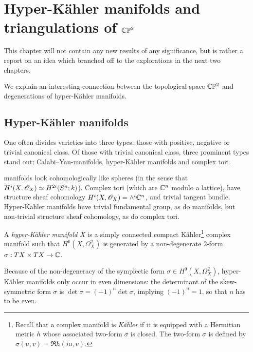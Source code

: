 \chapter{Hyper-Kähler manifolds and triangulations of \texorpdfstring{$\mathbb{C}\mathbb{P}^2$}{CP2}}
\label{sec:cp2triangs}

This chapter will not contain any new results of any significance, but is rather a report on an idea which branched off to the explorations in the next two chapters.

We explain an interesting connection between the topological space $\mathbb{C} \mathbb{P}^2$ and degenerations of hyper-Kähler manifolds.

\section{Hyper-Kähler manifolds} %
\label{sec:hyper_kähler_manifolds}

One often divides varieties into three types: those with positive, negative or trivial canonical class. Of those with trivial canonical class, three prominent types stand out: Calabi--Yau-manifolds, hyper-Kähler manifolds and complex tori.

\CY manifolds look cohomologically like spheres (in the sense that $H^i(X,\mathscr{O}_X) \simeq H^{2i}(S^n; k)$). Complex tori (which are $\mathbb{C}^n$ modulo a lattice), have structure sheaf cohomology $H^i(X,\mathscr{O}_X) = \wedge^i \mathbb{C}^n$, and trivial tangent bundle. Hyper-Kähler manifolds have trivial fundamental group, as do \CY manifolds, but non-trivial structure sheaf cohomology, as do complex tori.

\begin{definition}
A \emph{hyper-Kähler manifold} $X$ is a simply connected compact Kähler\footnote{Recall that a complex manifold is \emph{Kähler} if it is equipped with a Hermitian metric $h$ whose associated two-form $\sigma$ is closed. The two-form $\sigma$ is defined by $\sigma(u,v) = \Re h(iu,v)$.} complex manifold such that $H^0(X, \Omega_X^2)$ is generated by a non-degenerate $2$-form $\sigma: TX \times TX \to \mathbb{C}$.
\end{definition}

\begin{remark}
Because of the non-degeneracy of the symplectic form $\sigma \in H^0(X, \Omega_X^2)$, hyper-Kähler manifolds only occur in even dimensions: the determinant of the skew-symmetric form $\sigma$ is $\det \sigma = (-1)^n \det \sigma$, implying $(-1)^n=1$, so that $n$ has to be even.
\end{remark}

